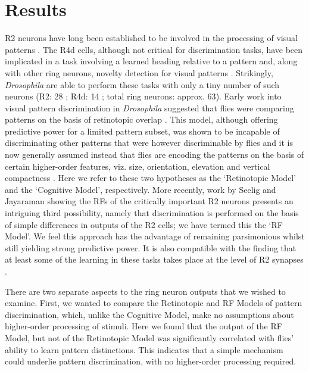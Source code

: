 \section{Results}
R2 neurons have long been established to be involved in the processing of visual patterns \cite{Pan2009,Liu2006,Ernst1999}.
The R4d cells, although not critical for discrimination tasks, have been implicated in a task involving a learned heading relative to a pattern \cite{Guo2015} and, along with other ring neurons, novelty detection for visual patterns \cite{Solanki2015}.
Strikingly, \emph{Drosophila} are able to perform these tasks with only a tiny number of such neurons (R2: 28 \cite{Seelig2013}; R4d: 14 \cite{Seelig2013}; total ring neurons: approx. 63\cite{MartinPena2014}).
Early work into visual pattern discrimination in \emph{Drosophila} suggested that flies were comparing patterns on the basis of retinotopic overlap \cite{Dill1995,Dill1993}.
This model, although offering predictive power for a limited pattern subset, was shown to be incapable of discriminating other patterns that were however discriminable by flies \cite{Ernst1999} and it is now generally assumed instead that flies are encoding the patterns on the basis of certain higher-order features, viz. size, orientation, elevation and vertical compactness \cite{Ernst1999,Liu2006,Pan2009}.
Here we refer to these two hypotheses as the `Retinotopic Model' and the `Cognitive Model', respectively.
More recently, work by Seelig and Jayaraman \cite{Seelig2013} showing the RFs of the critically important R2 neurons presents an intriguing third possibility, namely that discrimination is performed on the basis of simple differences in outputs of the R2 cells; we have termed this the `RF Model'.
We feel this approach has the advantage of remaining parsimonious whilst still yielding strong predictive power.
It is also compatible with the finding that at least some of the learning in these tasks takes place at the level of R2 synapses \cite{Wang2008}.

There are two separate aspects to the ring neuron outputs that we wished to examine.
First, we wanted to compare the Retinotopic and RF Models of pattern discrimination, which, unlike the Cognitive Model, make no assumptions about higher-order processing of stimuli.
Here we found that the output of the RF Model, but not of the Retinotopic Model was significantly correlated with flies' ability to learn pattern distinctions.
This indicates that a simple mechanism could underlie pattern discrimination, with no higher-order processing required.


